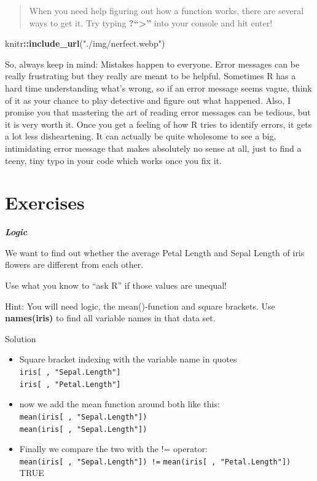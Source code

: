 \documentclass[
]{book}
\newenvironment{Shaded}{\begin{snugshade}}{\end{snugshade}}
\newcommand{\FunctionTok}[1]{\textcolor[rgb]{0.13,0.29,0.53}{\textbf{#1}}}
\newcommand{\NormalTok}[1]{#1}
\newcommand{\SpecialCharTok}[1]{\textcolor[rgb]{0.81,0.36,0.00}{\textbf{#1}}}
\newcommand{\StringTok}[1]{\textcolor[rgb]{0.31,0.60,0.02}{#1}}
\providecommand{\tightlist}{%
  \setlength{\itemsep}{0pt}\setlength{\parskip}{0pt}}
\begin{document}
\begin{quote}
When you need help figuring out how a function works, there are several ways to get it. Try typing \textbf{?``\textbar\textgreater{}'' } into your console and hit enter!
\end{quote}

\begin{Shaded}
\begin{Highlighting}[]
\NormalTok{knitr}\SpecialCharTok{::}\FunctionTok{include\_url}\NormalTok{(}\StringTok{"./img/nerfect.webp"}\NormalTok{)}
\end{Highlighting}
\end{Shaded}

So, always keep in mind: Mistakes happen to everyone.
Error messages can be really frustrating but they really are meant to be helpful.
Sometimes R has a hard time understanding what's wrong, so if an error message seems vague, think of it as your chance to play detective and figure out what happened.
Also, I promise you that mastering the art of reading error messages can be tedious, but it is very worth it.
Once you get a feeling of how R tries to identify errors, it gets a lot less disheartening.
It can actually be quite wholesome to see a big, intimidating error message that makes absolutely no sense at all, just to find a teeny, tiny typo in your code which works once you fix it.

\section*{Exercises}\label{exercises}

\textbf{\emph{Logic}}

We want to find out whether the average Petal Length and Sepal Length of iris flowers are different from each other.

Use what you know to ``ask R'' if those values are unequal!

Hint: You will need logic, the mean()-function and square brackets. Use \textbf{names(iris)} to find all variable names in that data set.

Solution

\begin{itemize}
\tightlist
\item
  Square bracket indexing with the variable name in quotes \newline
  \texttt{iris{[}\ ,\ "Sepal.Length"{]}}\\
  \texttt{iris{[}\ ,\ "Petal.Length"{]}}
\item
  now we add the mean function around both like this:
  \texttt{mean(iris{[}\ ,\ "Sepal.Length"{]})}\\
  \texttt{mean(iris{[}\ ,\ "Sepal.Length"{]})}
\item
  Finally we compare the two with the != operator:
  \texttt{mean(iris{[}\ ,\ "Sepal.Length"{]})\ !=}
  \texttt{mean(iris{[}\ ,\ "Petal.Length"{]})}\\
  TRUE
\end{itemize}
\end{document}
